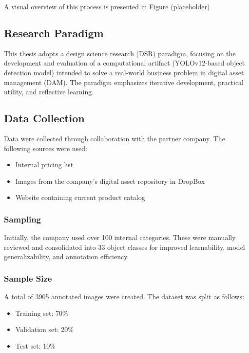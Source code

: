 \documentclass[a4paper,10pt,twocolumn]{article}
\numberwithin{figure}{section}
\numberwithin{table}{section}
\begin{document}
A visual overview of this process is presented in Figure (placeholder)

\subsection{Research Paradigm}

This thesis adopts a design science research (DSR)
paradigm, focusing on the development and evaluation 
of a computational artifact (YOLOv12-based object 
detection model) intended to solve a real-world 
business problem in digital asset management (DAM). 
The paradigm emphasizes iterative development, 
practical utility, and reflective learning.

\subsection{Data Collection}

Data were collected through collaboration 
with the partner company. The following 
sources were used:

\begin{itemize} 
    \item Internal pricing list 
    \item Images from the company’s digital asset repository in DropBox
    \item Website containing current product catalog
\end{itemize} 

\vspace{0.3cm} 
\subsubsection{Sampling}
\vspace{0.3cm} 
Initially, the company used over 100 internal 
categories. These were manually reviewed and 
consolidated into 33 object classes for improved 
learnability, model generalizability, and annotation 
efficiency.
\vspace{0.3cm} 
\subsubsection{Sample Size}
\vspace{0.3cm} 
A total of 3905 annotated images were created. 
The dataset was split as follows:
\begin{itemize} 
    \item Training set: 70\% 
    \item Validation set: 20\%
    \item Test set: 10\%
\end{itemize} 
\end{document}
